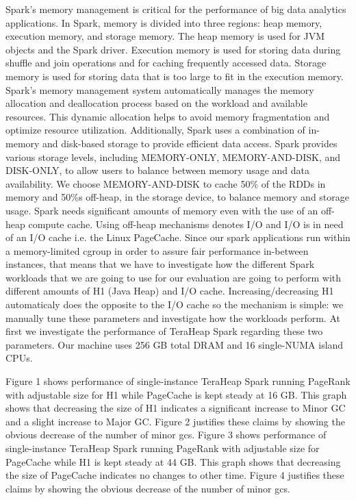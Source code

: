 Spark's memory management is critical for the performance of big data
analytics applications. In Spark, memory is divided into three
regions: heap memory, execution memory, and storage memory. The heap
memory is used for JVM objects and the Spark driver. Execution memory
is used for storing data during shuffle and join operations and for
caching frequently accessed data. Storage memory is used for storing
data that is too large to fit in the execution memory. Spark's memory
management system automatically manages the memory allocation and
deallocation process based on the workload and available resources.
This dynamic allocation helps to avoid memory fragmentation and
optimize resource utilization. Additionally, Spark uses a combination
of in-memory and disk-based storage to provide efficient data access.
Spark provides various storage levels, including MEMORY-ONLY,
MEMORY-AND-DISK, and DISK-ONLY, to allow users to balance between
memory usage and data availability. We choose MEMORY-AND-DISK to cache
50\% of the RDDs in memory and 50\%s off-heap, in the storage device,
to balance memory and storage usage. Spark needs significant amounts
of memory even with the use of an off-heap compute cache. Using
off-heap mechanisms denotes I/O and I/O is in need of an I/O cache
i.e. the Linux PageCache. Since our spark applications run within a
memory-limited cgroup in order to assure fair performance in-between
instances, that means that we have to investigate how the different
Spark workloads that we are going to use for our evaluation are going
to perform with different amounts of H1 (Java Heap) and I/O cache.
Increasing/decreasing H1 automaticaly does the opposite to the I/O
cache so the mechanism is simple: we manually tune these parameters
and investigate how the workloads perform. At first we investigate the
performance of TeraHeap Spark regarding these two parameters. Our
machine uses 256 GB total DRAM and 16 single-NUMA island CPUs.


Figure 1 shows performance of single-instance TeraHeap Spark
running PageRank with adjustable size for H1 while PageCache is kept
steady at 16 GB. This graph shows that decreasing the size of H1
indicates a significant increase to Minor GC and a slight increase to
Major GC. Figure 2 justifies these claims by showing the obvious
decrease of the number of minor gcs. Figure 3 shows performance of
single-instance TeraHeap Spark running PageRank with adjustable size
for PageCache while H1 is kept steady at 44 GB. This graph shows that
decreasing the size of PageCache indicates no changes to other time.
Figure 4 justifies these claims by showing the obvious decrease of the
number of minor gcs.
 

